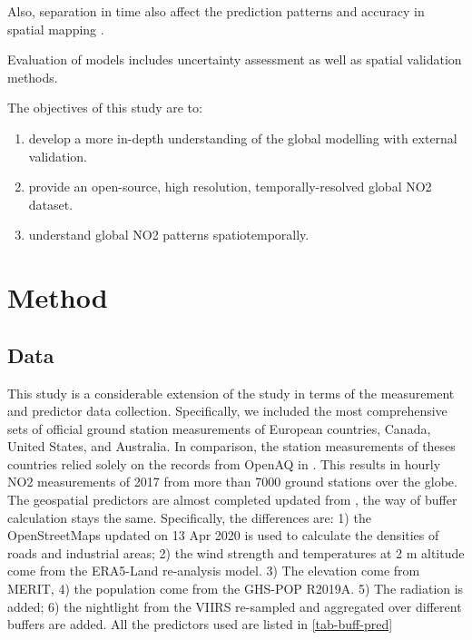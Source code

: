 \documentclass{article}
\begin{document}
Also, separation in time also affect the prediction patterns and accuracy in spatial mapping \citep{LU2020105856}.

 Evaluation of models includes uncertainty assessment as well as spatial validation methods. 
  

The objectives of this study are to: 
 \begin{enumerate}
\item develop a more in-depth understanding of the global modelling with external validation. 


\item provide an open-source, high resolution, temporally-resolved global NO2 dataset.

\item understand global NO2 patterns spatiotemporally. 
 
\end{enumerate}



 

\section{Method}


\subsection{Data}
This study is a considerable extension of the study \citep{LU2020105856} in terms of the measurement and predictor data collection. Specifically, we included the most comprehensive sets of official ground station measurements of European countries, Canada, United States, and Australia. In comparison, the station measurements of theses countries relied solely on the records from OpenAQ in \cite{LU2020105856}. This results in hourly NO2 measurements of 2017 from more than 7000 ground stations over the globe. The geospatial predictors are almost completed updated from \citep{LU2020105856}, the way of buffer calculation stays the same. Specifically, the differences are: 1) the OpenStreetMaps updated on 13 Apr 2020 is used to calculate the densities of roads and industrial areas; %
2) the wind strength and temperatures at 2 m altitude come from the ERA5-Land re-analysis model. 3) The elevation come from MERIT, 4) the population come from the GHS-POP R2019A. 5) The radiation is added; 6) the nightlight from the VIIRS re-sampled and aggregated over different buffers are added. All the predictors used are listed in \cref{tab-buff-pred} 
 
\end{document}
